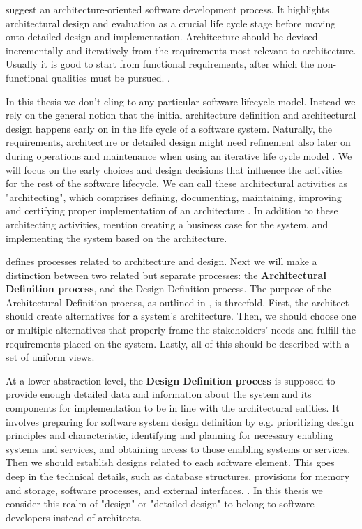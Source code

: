 \documentclass[utf8,english]{gradu3}
\begin{document}
\textcite{Koskimies2005} suggest an architecture-oriented software
development process. It highlights architectural design and evaluation as a
crucial life cycle stage before moving onto detailed design and implementation.
Architecture should be devised incrementally and iteratively from the
requirements most relevant to architecture. Usually it is good to start from
functional requirements, after which the non-functional qualities must be
pursued. \parencite{Koskimies2005}.

In this thesis we don't cling to any particular software lifecycle model.
Instead we rely on the general notion that the initial architecture definition
and architectural design happens early on in the life cycle of a software
system. Naturally, the requirements, architecture or detailed design might need
refinement also later on during operations and maintenance when using an
iterative life cycle model \parencite{IEEE12207}. We will focus on the early choices and
design decisions that influence the activities for the rest of the software
lifecycle. We can call these architectural activities as "architecting", which
comprises defining, documenting, maintaining, improving and certifying proper
implementation of an architecture \parencite[3]{IEEE42010}. In addition to these
architecting activities, \textcite[12]{Bass1998} mention creating a business case
for the system, and implementing the system based on the architecture.

\textcite{IEEE12207} defines processes related to architecture and design. Next we will
make a distinction between two related but separate processes: the \textbf{Architectural
  Definition process}, and the Design Definition process. The purpose of the
Architectural Definition process, as outlined in \textcite[66]{IEEE12207}, is threefold.
First, the architect should create alternatives for a system's architecture.
Then, we should choose one or multiple alternatives that properly frame the
stakeholders' needs and fulfill the requirements placed on the system. Lastly,
all of this should be described with a set of uniform views.

At a lower abstraction level, the \textbf{Design Definition process} \parencite[71]{IEEE12207} is
supposed to provide enough detailed data and information about the system and
its components for implementation to be in line with the architectural entities.
It involves preparing for software system design definition by e.g. prioritizing
design principles and characteristic, identifying and planning for necessary
enabling systems and services, and obtaining access to those enabling systems or
services. Then we should establish designs related to each software element.
This goes deep in the technical details, such as database structures, provisions
for memory and storage, software processes, and external interfaces. \parencite[72]{IEEE12207}.
In this thesis we consider this realm of "design" or "detailed design" to
belong to software developers instead of architects.
\end{document}
